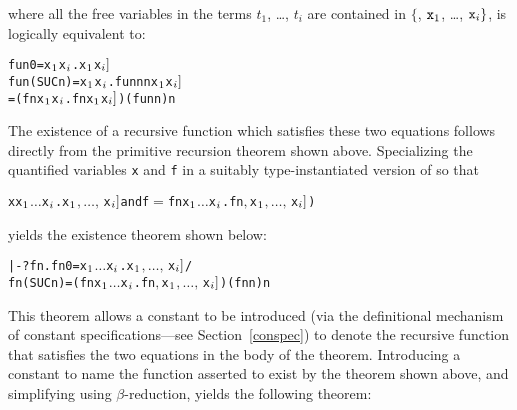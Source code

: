 \noindent where all the free variables in the  terms $t_1$,
\dots, $t_i$ are contained in $\{$, $\ml{x}_1$, \dots, $\ml{x}_i\}$,
is logically equivalent to:

\begin{hol}
\begin{alltt}
   fun 0       = \bs{}x\(\sb{1}\) \m{\dots} x\(\sb{i}\).\m{f\sb{1}[}x\(\sb{1}\)\m{,\ldots,\,}x\(\sb{i}]\)
   fun (SUC n) = \bs{}x\(\sb{1}\) \m{\dots} x\(\sb{i}\).\m{f\sb{2}[}fun n  n\m{,}x\(\sb{1}\)\m{,\ldots,\,}x\(\sb{i}]\)
               = (\bs{}f n x\(\sb{1}\) \m{\dots} x\(\sb{i}\).\m{f\sb{2}[}f  n\m{,} x\(\sb{1}\)\m{,\ldots,\,}x\(\sb{i}]\)) (fun n) n
\end{alltt}
\end{hol}

The existence  of  a  recursive  function   which  satisfies these two
equations follows directly from the primitive recursion theorem
 shown above.   Specializing the  quantified variables \verb!x!
and \verb!f!  in  a suitably  type-instantiated version  of  so
that

\begin{hol}
\begin{alltt}
   x\m{=}\bs{}x\(\sb{1}\) \(\dots\) x\(\sb{i}\).\m{f\sb{1}[}x\(\sb{1}\)\(,\ldots,\,\)x\(\sb{i}]\)  {\rm and}  f\(=\)\bs{}f n x\(\sb{1}\) \(\dots\) x\(\sb{i}\).\m{f\sb{2}[}f  n\(,\) x\(\sb{1}\)\(,\ldots,\,\)x\(\sb{i}]\))
\end{alltt}
\end{hol}

\noindent yields the existence theorem shown below:

\begin{hol}
\begin{alltt}
   |- ?fn. fn 0       = \bs{}x\(\sb{1}\) \(\dots\) x\(\sb{i}\).\m{f\sb{1}[}x\(\sb{1}\)\(,\ldots,\,\)x\(\sb{i}]\) /\bs{}
           fn (SUC n) = (\bs{}f n x\(\sb{1}\) \(\dots\) x\(\sb{i}\).\m{f\sb{2}[}f  n\(,\) x\(\sb{1}\)\(,\ldots,\,\)x\(\sb{i}]\)) (fn n) n
\end{alltt}
\end{hol}

\noindent This theorem allows a constant  to be introduced (via the
definitional mechanism of constant specifications---see Section~\ref{conspec})
to denote the recursive function that satisfies the two equations in the body
of the theorem. Introducing a constant  to name the function asserted
to exist by the theorem shown above, and simplifying using $\beta$-reduction,
yields the following theorem:

